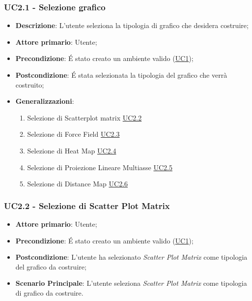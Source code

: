 \subsubsection{UC2.1 - Selezione grafico}
\label{ssub:uc2.1}
\begin{itemize}

	\item \textbf{Descrizione}: L’utente seleziona la tipologia di grafico che desidera costruire;

    \item \textbf{Attore primario}: Utente;

	\item \textbf{Precondizione}:   É stato creato un ambiente valido (\hyperref[sub:uc1]{UC1});
	
    \item \textbf{Postcondizione}:  É stata selezionata la tipologia del grafico che verrà costruito;

	\item \textbf{Generalizzazioni}:
		\begin{enumerate}
			
			\item Selezione di Scatterplot matrix \hyperref[ssub:uc2.2]{UC2.2}
			\item Selezione di Force Field \hyperref[ssub:uc2.3]{UC2.3}
			\item Selezione di Heat Map \hyperref[ssub:uc2.4]{UC2.4}
			\item Selezione di Proiezione Lineare Multiasse \hyperref[ssub:uc2.5]{UC2.5}
			\item Selezione di Distance Map \hyperref[ssub:uc2.6]{UC2.6}
			
		\end{enumerate}

\end{itemize}


\subsubsection{UC2.2 - Selezione di Scatter Plot Matrix}
\label{ssub:uc2.2}
\begin{itemize}

    \item \textbf{Attore primario}: Utente;

	\item \textbf{Precondizione}:   É stato creato un ambiente valido (\hyperref[sub:uc1]{UC1});

	\item \textbf{Postcondizione}:  L'utente ha selezionato \emph{Scatter Plot Matrix} come tipologia del grafico da 
	costruire;

	\item \textbf{Scenario Principale}: L'utente seleziona \emph{Scatter Plot Matrix} come tipologia di grafico da 
	costruire.
\end{itemize}


